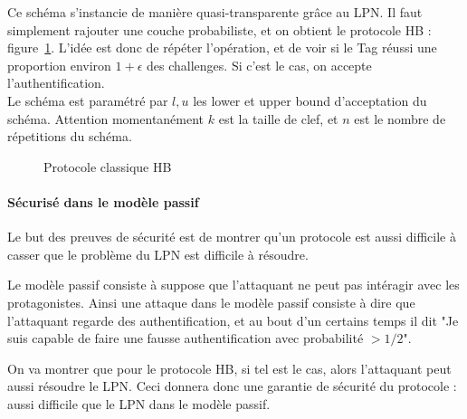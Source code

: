\documentclass{article}		%
\theoremstyle{definition}
\theoremstyle{plain}
\theoremstyle{plain}
\theoremstyle{plain}
\theoremstyle{plain}
\theoremstyle{plain}
\begin{document}
Ce schéma s'instancie de manière quasi-transparente grâce au LPN. Il
faut simplement rajouter une couche probabiliste, et on obtient le
protocole HB : figure~\ref{hb}. L'idée est donc de répéter l'opération,
et de voir si le Tag réussi une proportion environ $1+\epsilon$ des
challenges. Si c'est le cas, on accepte l'authentification.
\\Le schéma est paramétré par $l,u$ les lower et upper bound
d'acceptation du schéma. Attention momentanément $k$ est la taille de
clef, et $n$ est le nombre de répetitions du schéma.


\begin{figure}
\centering
{}
\caption{Protocole classique HB}
\label{hb}
\end{figure}
\paragraph{Sécurisé dans le modèle passif}
Le but des preuves de sécurité est de montrer qu'un protocole est aussi
difficile à casser que le problème du LPN est difficile à résoudre.

Le modèle passif consiste à suppose que l'attaquant ne peut pas intéragir
avec les protagonistes. Ainsi une attaque dans le modèle passif consiste
à dire que l'attaquant regarde des authentification, et au
bout d'un certains temps il dit "Je suis capable de faire une fausse
authentification avec probabilité $>1/2$".

 On va montrer que pour le protocole HB, si tel est
le cas, alors l'attaquant peut aussi résoudre le LPN. Ceci donnera donc
une garantie de sécurité du protocole : aussi difficile que le LPN dans
le modèle passif.
\end{document}
